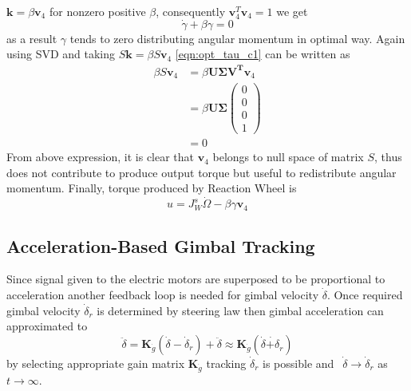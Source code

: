 $\displaystyle \mathbf{k} =\beta \mathbf{v}_{4}$ for nonzero positive $\displaystyle \beta $, consequently $\displaystyle \mathbf{v}^{T}_{4}\mathbf{v}_{4} =1$ we get
\begin{equation}
\dot{\gamma } +\beta \gamma =0
\end{equation}
as a result $\displaystyle \gamma $ tends to zero distributing angular momentum in optimal way. Again using SVD and taking $\displaystyle S\mathbf{k} =\beta S\mathbf{v}_{4}$ \autoref{eqn:opt_tau_c1} can be written as 
\begin{equation}
\begin{aligned}
\beta S\mathbf{v}_{4} & =\beta \mathbf{U\Sigma V^{T} v}_{4}\\
 & =\beta \mathbf{U\Sigma }\begin{pmatrix}
0\\
0\\
0\\
1
\end{pmatrix}\\
 & =0
\end{aligned}
\end{equation}
From above expression, it is clear that $\displaystyle \mathbf{v}_{4}$ belongs to null space of matrix $\displaystyle S$, thus does not contribute to produce output torque but useful to redistribute angular momentum. Finally, torque produced by Reaction Wheel is
\begin{equation}
u =J^{s}_{W}\dot{\Omega } -\beta \gamma \mathbf{v}_{4}
\end{equation}

\subsection{Acceleration-Based Gimbal Tracking}
Since signal given to the electric motors are superposed to be proportional to acceleration another feedback loop is needed for gimbal velocity $\displaystyle \dot{\delta }$. Once required gimbal velocity $\displaystyle \dot{\delta }_{r}$ is determined by steering law then gimbal acceleration can approximated to
\begin{equation}
\ddot{\delta } =\mathbf{K}_{\dot{g}}(\dot{\delta } -\dot{\delta }_{r}) +\ddot{\delta } \approx \mathbf{K}_{\dot{g}}(\dot{\delta }\dot{+\delta }_{r})
\end{equation}
by selecting appropriate gain matrix $\displaystyle \mathbf{K}_{\dot{g}}$ tracking $\displaystyle \dot{\delta }_{r}$ is possible and $\displaystyle \ \ \dot{\delta }\rightarrow \dot{\delta }_{r}$ as $\displaystyle t\rightarrow \infty $.


